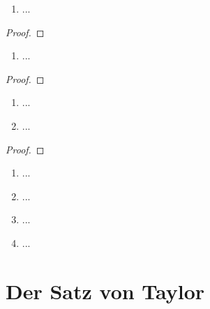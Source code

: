 \documentclass[12pt]{scrreprt}
\begin{document}
\begin{dfn}\label{}

\end{dfn}
\begin{bem*}

\end{bem*}

\begin{satz}\label{}

\end{satz}
\begin{bsp}\label{}
\begin{enumerate}
\item ...
\end{enumerate}
\end{bsp}
\begin{proof}

\end{proof}

\begin{bsp}\label{}
\begin{enumerate}
\item ...
\end{enumerate}
\end{bsp}
\begin{proof}

\end{proof}

\begin{thm}\label{}
\begin{enumerate}
\item ...
\item ...
\end{enumerate}
\end{thm}
\begin{proof}

\end{proof}

\begin{bsp}\label{}
\begin{enumerate}
\item ...
\item ...
\item ...
\item ...
\end{enumerate}
\end{bsp}

\section{Der Satz von Taylor}
\label{}
\end{document}
